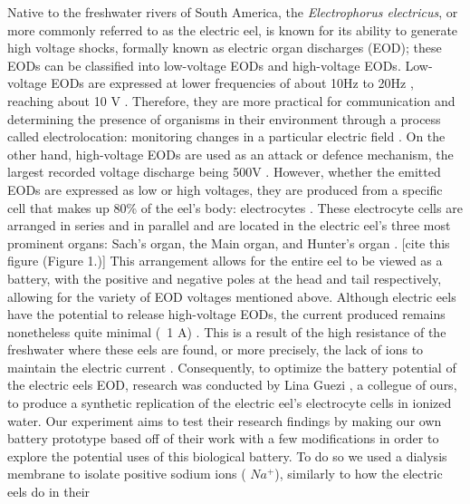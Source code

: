 \documentclass[letterpaper]{article}
\begin{document}
Native to the freshwater rivers of South America, the \textit{Electrophorus electricus}, or more 
commonly referred to as the electric eel, is known for its ability to generate high voltage shocks,
formally known as electric organ discharges (EOD); these EODs can be classified into low-voltage 
EODs and high-voltage EODs. Low-voltage EODs are expressed at lower frequencies of about 10Hz to
20Hz \parencite{cataniaAstonishingBehaviorElectric2019}, reaching about 10 V \parencite{ElectricCircuits6ElectricEels2015}. 
Therefore, they are more practical for communication and determining the presence of organisms 
in their environment through a process called electrolocation: monitoring 
changes in a particular electric field \parencite{bennettComparativePhysiologyElectric1970}. 
On the other hand, high-voltage EODs are used as an attack or defence mechanism,
the largest recorded voltage discharge being 500V \parencite{ElectricCircuits6ElectricEels2015}.
However, whether the emitted EODs are expressed as low or high 
voltages, they are produced from a specific cell that makes up 80\% of the eel’s body: electrocytes
\parencite{carlsonAnimalBehaviorElectric2015}. These electrocyte cells are arranged in series and 
in parallel and are located in the electric eel’s three most prominent organs: Sach’s organ, the 
Main organ, and Hunter’s organ \parencite{ElectricCircuits6ElectricEels2015}. [cite this figure (Figure 1.)] This 
arrangement allows for the entire eel to be viewed as a battery, with the positive and negative 
poles at the head and tail respectively, allowing for the variety of EOD voltages mentioned above. 
Although electric eels have the potential to release high-voltage EODs, the current produced remains
nonetheless quite minimal (~1 A) \parencite{ElectricCircuits6ElectricEels2015}. This is a result 
of the high resistance of the freshwater where these eels are found, or more precisely, the lack of 
ions to maintain the electric current \parencite{boisseletBiomimeticPotentialElectric2017}. 
Consequently, to optimize the battery potential of the electric eels EOD, research was conducted 
by Lina Guezi \parencite{gueziTheoreticalExaminationConception2023}, a collegue of ours, to produce 
a synthetic replication of the electric eel’s electrocyte 
cells in ionized water. Our experiment aims to test their research findings by making our own battery prototype based off of their work with a few modifications in order to explore 
the potential uses of this biological battery. To do so we used a dialysis membrane to isolate positive sodium ions ( $Na^+$), similarly to how the electric eels do in their
\end{document}

